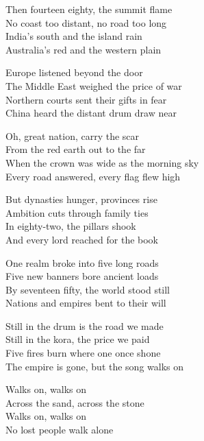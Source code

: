 \begin{lyrics}
Then fourteen eighty, the summit flame\\
No coast too distant, no road too long\\
India's south and the island rain\\
Australia's red and the western plain

Europe listened beyond the door\\
The Middle East weighed the price of war\\
Northern courts sent their gifts in fear\\
China heard the distant drum draw near

Oh, great nation, carry the scar\\
From the red earth out to the far\\
When the crown was wide as the morning sky\\
Every road answered, every flag flew high

But dynasties hunger, provinces rise\\
Ambition cuts through family ties\\
In eighty-two, the pillars shook\\
And every lord reached for the book

One realm broke into five long roads\\
Five new banners bore ancient loads\\
By seventeen fifty, the world stood still\\
Nations and empires bent to their will

Still in the drum is the road we made\\
Still in the kora, the price we paid\\
Five fires burn where one once shone\\
The empire is gone, but the song walks on

Walks on, walks on\\
Across the sand, across the stone\\
Walks on, walks on\\
No lost people walk alone
\end{lyrics}


